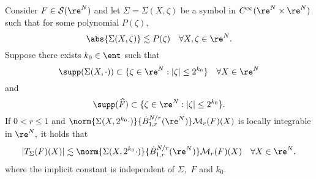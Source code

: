 \begin{lem}\label{lem:Marschall} Consider $F\in \mathcal{S}(\re^N)$ and let $\Sigma=\Sigma(X, \zeta)$ be a  symbol in $C^\infty(\re^N \times \re^N)$ such that for some polynomial $P(\zeta),$
\[
\abs{\Sigma(X, \zeta)}\lesssim P(\zeta)\quad \forall X,\zeta\in\re^N.
\]
Suppose there exists $k_0\in \ent$ such that
$$
\supp (\Sigma(X, \cdot)) \subset  \{ \zeta \in \re^N:  |\zeta| \le 2^{k_0}\}\quad \forall X\in \re^N
$$
and
$$
\supp(\widehat{F})  \subset  \{ \zeta \in \re^N:  |\zeta| \le 2^{k_0}\}.
$$
If $0<r \le 1$ and $\norm{\Sigma(X, 2^{k_0} \cdot)}{\dot{B}^{N/r}_{1,r}(\re^N)} \mathcal{M}_r(F)(X)$ is locally integrable in $\re^N,$ it holds that
\begin{equation}\label{eq:Marschall:N}
|T_{\Sigma}(F)(X)| \lesssim \norm{\Sigma(X, 2^{k_0} \cdot)}{\dot{B}^{N/r}_{1,r}(\re^N)} \mathcal{M}_r(F)(X) \quad \forall X \in \re^N,
\end{equation}
where the implicit constant is independent of $\Sigma,$ $F$ and $k_0.$
\end{lem}

